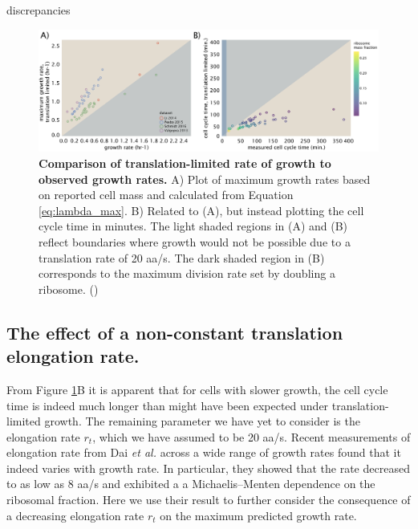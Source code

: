 discrepancies \documentclass[11pt, letterpaper]{article}
\begin{document}


\begin{figure}[H]
		\centering
    \includegraphics[width=1\textwidth]{../../code/figures/SI/estimates_translation_data.pdf}
  \caption{{\bf Comparison of translation-limited rate of growth to observed growth rates.}
	A) Plot of maximum growth rates based on reported cell mass and calculated from Equation \ref{eq:lambda_max}.
	B) Related to (A), but instead plotting the cell cycle time in minutes.
	The light shaded regions in (A) and (B) reflect boundaries where growth would not be possible
	due to a translation rate of 20 aa/s. The dark shaded region in (B) corresponds to the maximum
	division rate set by doubling a ribosome.
	()}
  \label{fig:estimates_translation_data}
\end{figure}

\subsection{The effect of a non-constant translation elongation rate.}

From Figure \ref{fig:estimates_translation_data}B it is apparent that for cells
with slower growth, the cell cycle time is indeed much longer than might have
been expected under translation-limited growth. The remaining parameter we have yet to
consider is the elongation rate $r_t$, which we have assumed to be 20 aa/s. Recent
measurements of elongation rate from Dai {\it et al.} \cite{Dai2016} across a
wide range of growth rates found that it indeed varies with growth rate. In particular,
they showed that the rate decreased to as low as 8 aa/s and exhibited a a Michaelis–Menten dependence on the
ribosomal fraction. Here we use their result to further consider the consequence of a
decreasing elongation rate $r_t$ on the maximum predicted growth rate.
\end{document}

